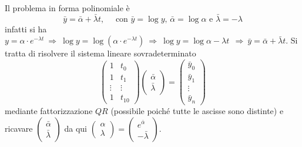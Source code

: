 \begin{sol}
	\normalfont
	Il problema in forma polinomiale è
	$$\bar{y}=\bar{\alpha}+\bar{\lambda}t,\quad\mbox{ con }\bar{y}=\log{y}\mbox{, }\bar{\alpha}=\log{\alpha}\mbox{ e }\bar{\lambda}=-\lambda$$
	infatti si ha
	$y=\alpha\cdot e^{-\lambda t}\:\Rightarrow\:\log{y}=\log{(\alpha\cdot e^{-\lambda t})}\:\Rightarrow\:\log{y}=\log{\alpha}-\lambda t\:\:\Rightarrow\:\bar{y}=\bar{\alpha}+\bar{\lambda}t$.
	Si tratta di risolvere il sistema lineare sovradeterminato $$\begin{pmatrix}1&t_0\\1&t_1\\\vdots&\vdots\\1&t_10\end{pmatrix}\begin{pmatrix}\bar{\alpha}\\\bar{\lambda}\end{pmatrix}=\begin{pmatrix}\bar{y}_0\\\bar{y}_1\\\vdots\\\bar{y}_n\end{pmatrix}$$
	mediante fattorizzazione $QR$ (possibile poiché tutte le ascisse sono distinte) e ricavare $\begin{pmatrix}\bar{\alpha}\\\bar{\lambda}\end{pmatrix}$ da qui $\begin{pmatrix}\alpha\\\lambda\end{pmatrix}=\begin{pmatrix}e^{\bar{\alpha}}\\-\bar{\lambda}\end{pmatrix}.$\\

\end{sol}

